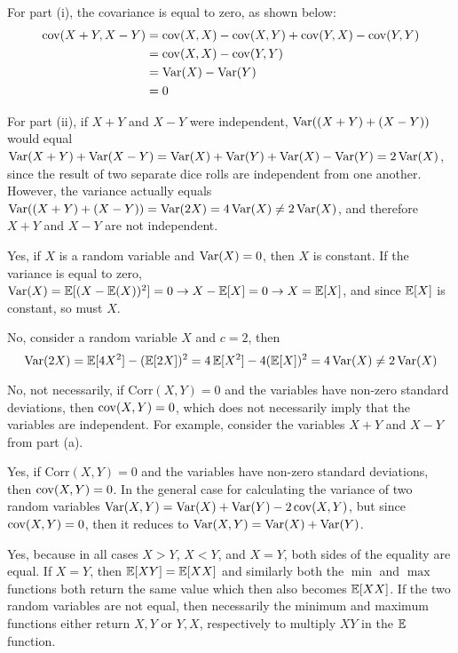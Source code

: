 \documentclass[11pt]{article}
\begin{document}
\begin{solution}
	
\begin{Parts}
	
\Part For part (i), the covariance is equal to zero, as shown below:
\[
	\begin{split}
		\operatorname{cov}(X+Y, X-Y) &= \operatorname{cov}(X, X) - \operatorname{cov}(X, Y) + \operatorname{cov}(Y, X) - \operatorname{cov}(Y, Y) \\
		&= \operatorname{cov}(X, X) - \operatorname{cov}(Y, Y) \\
		&= \operatorname{Var}(X) - \operatorname{Var}(Y) \\
		&= 0
	\end{split}
\]

For part (ii), if $X+Y$ and $X-Y$ were independent, $\operatorname{Var}((X+Y)+(X-Y))$ would equal
$\operatorname{Var}(X+Y) + \operatorname{Var}(X-Y) = \operatorname{Var}(X) + \operatorname{Var}(Y) + \operatorname{Var}(X) - \operatorname{Var}(Y) = 2\operatorname{Var}(X)$, since
the result of two separate dice rolls are independent from one another. However, 
the variance actually equals $\operatorname{Var}((X+Y)+(X-Y)) = \operatorname{Var}(2X) = 4\operatorname{Var}(X) \neq 2\operatorname{Var}(X)$,
and therefore $X+Y$ and $X-Y$ are not independent.

\Part Yes, if $X$ is a random variable and $\operatorname{Var}(X) = 0$, then $X$ is constant. 
If the variance is equal to zero, $\operatorname{Var}(X) = \operatorname{\mathbb{E}}[(X-\operatorname{\mathbb{E}}(X))^2] = 0 \rightarrow 
X - \operatorname{\mathbb{E}}[X] = 0 \rightarrow X = \operatorname{\mathbb{E}}[X]$, and since $\operatorname{\mathbb{E}}[X]$ is constant, so must
$X$. 

\Part No, consider a random variable $X$ and $c=2$, then 
\[
	\operatorname{Var}(2X) = \operatorname{\mathbb{E}}[4X^2] - (\operatorname{\mathbb{E}}[2X])^2 = 4 \operatorname{\mathbb{E}}[X^2] - 4 (\operatorname{\mathbb{E}}[X])^2 = 4\operatorname{Var}(X) \neq 2\operatorname{Var}(X)
\]

\Part No, not necessarily, if $\text{Corr}(X, Y) = 0$ and the variables have
non-zero standard deviations, then $\operatorname{cov}(X,Y) = 0$, which does not necessarily
imply that the variables are independent. For example, consider the variables
$X+Y$ and $X-Y$ from part (a).

\Part Yes, if $\text{Corr}(X, Y) = 0$ and the variables have non-zero standard 
deviations, then $\operatorname{cov}(X,Y) = 0$. In the general case for calculating the 
variance of two random variables $\operatorname{Var}(X, Y) = \operatorname{Var}(X) + \operatorname{Var}(Y) - 2\operatorname{cov}(X, Y)$,
but since $\operatorname{cov}(X, Y) = 0$, then it reduces to $\operatorname{Var}(X, Y) = \operatorname{Var}(X) + \operatorname{Var}(Y)$.

\Part Yes, because in all cases $X > Y$, $X < Y$, and $X = Y$, both sides of the
equality are equal. If $X=Y$, then $\operatorname{\mathbb{E}}[XY] = \operatorname{\mathbb{E}}[XX]$ and similarly both the $\min$
and $\max$ functions both return the same value which then also becomes $\operatorname{\mathbb{E}}[XX]$. 
If the two random variables are not equal, then necessarily the minimum and maximum
functions either return $X, Y$ or $Y, X$, respectively to multiply $XY$ in the $\operatorname{\mathbb{E}}$ 
function. 


\end{Parts}
\end{solution}
\end{document}
